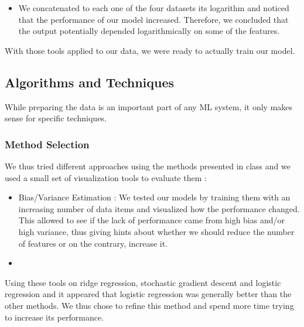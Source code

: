 \documentclass[10pt,conference,compsocconf]{IEEEtran}
\begin{document}
\begin{itemize}
\item We concatenated to each one of the four datasets its logarithm and noticed that the performance of our model increased. Therefore, we concluded that the output potentially depended logarithmically on some of the features. 

\end{itemize}

With those tools applied to our data, we were ready to actually  train our model.

\subsection{Algorithms and Techniques}
While preparing the data is an important part of any ML system, it only makes sense for specific techniques. 
\subsubsection{Method Selection}
We thus tried different approaches using the methods presented in class and we used a small set of visualization tools to evaluate them :
\begin{itemize}
\item Bias/Variance Estimation :
We tested our models by training them with an increasing number of data items and visualized how the performance changed. This allowed to see if the lack of performance came from high bias and/or high variance, thus giving hints about whether we should reduce the number of features or on the contrary, increase it.

\item 
\end{itemize}

Using these tools on ridge regression, stochastic gradient descent and logistic regression and it appeared that logistic regression was generally better than the other methods. We thus chose to refine this method
and spend more time trying to increase its performance. 
\end{document}
